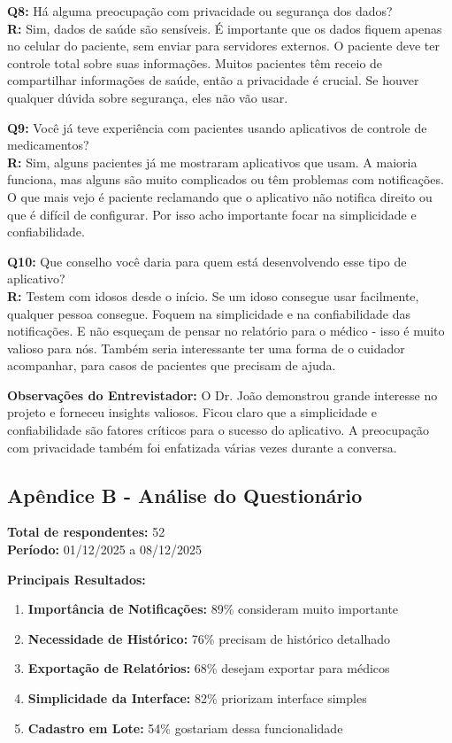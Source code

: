\documentclass[12pt]{article}
\begin{document}
\textbf{Q8:} Há alguma preocupação com privacidade ou segurança dos dados? \\
\textbf{R:} Sim, dados de saúde são sensíveis. É importante que os dados fiquem apenas no celular do paciente, sem enviar para servidores externos. O paciente deve ter controle total sobre suas informações. Muitos pacientes têm receio de compartilhar informações de saúde, então a privacidade é crucial. Se houver qualquer dúvida sobre segurança, eles não vão usar.

\textbf{Q9:} Você já teve experiência com pacientes usando aplicativos de controle de medicamentos? \\
\textbf{R:} Sim, alguns pacientes já me mostraram aplicativos que usam. A maioria funciona, mas alguns são muito complicados ou têm problemas com notificações. O que mais vejo é paciente reclamando que o aplicativo não notifica direito ou que é difícil de configurar. Por isso acho importante focar na simplicidade e confiabilidade.

\textbf{Q10:} Que conselho você daria para quem está desenvolvendo esse tipo de aplicativo? \\
\textbf{R:} Testem com idosos desde o início. Se um idoso consegue usar facilmente, qualquer pessoa consegue. Foquem na simplicidade e na confiabilidade das notificações. E não esqueçam de pensar no relatório para o médico - isso é muito valioso para nós. Também seria interessante ter uma forma de o cuidador acompanhar, para casos de pacientes que precisam de ajuda.

\textbf{Observações do Entrevistador:} O Dr. João demonstrou grande interesse no projeto e forneceu insights valiosos. Ficou claro que a simplicidade e confiabilidade são fatores críticos para o sucesso do aplicativo. A preocupação com privacidade também foi enfatizada várias vezes durante a conversa.

\subsection{Apêndice B - Análise do Questionário}

\textbf{Total de respondentes:} 52 \\
\textbf{Período:} 01/12/2025 a 08/12/2025

\textbf{Principais Resultados:}

\begin{enumerate}
    \item \textbf{Importância de Notificações:} 89\% consideram muito importante
    \item \textbf{Necessidade de Histórico:} 76\% precisam de histórico detalhado
    \item \textbf{Exportação de Relatórios:} 68\% desejam exportar para médicos
    \item \textbf{Simplicidade da Interface:} 82\% priorizam interface simples
    \item \textbf{Cadastro em Lote:} 54\% gostariam dessa funcionalidade
\end{enumerate}
\end{document}
